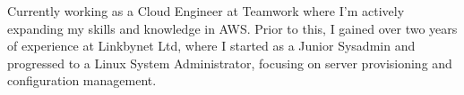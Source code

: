

\begin{cvparagraph}

Currently working as a Cloud Engineer at Teamwork where I’m actively expanding my skills and knowledge in AWS. Prior to this,
I gained over two years of experience at Linkbynet Ltd, where I started as a Junior Sysadmin and progressed to a Linux System Administrator,
focusing on server provisioning and configuration management.
\end{cvparagraph}

